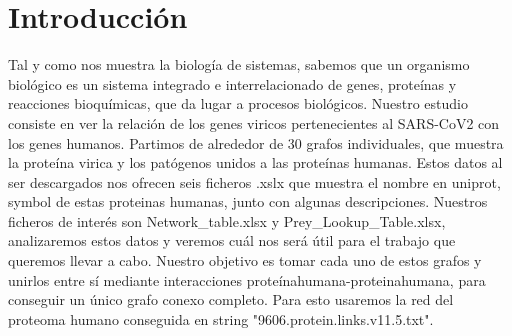 \section{Introducción}

Tal y como nos muestra la biolog\'ia de sistemas, sabemos que un organismo biol\'ogico es un sistema integrado e interrelacionado de genes,
prote\'inas y reacciones bioqu\'imicas, que da lugar a procesos biol\'ogicos. Nuestro estudio consiste en ver la relación de los genes viricos 
pertenecientes al SARS-CoV2 con los genes humanos. Partimos de alrededor de 30 grafos individuales, que muestra la prote\'ina virica y los
pat\'ogenos unidos a las prote\'inas humanas. Estos datos al ser descargados nos ofrecen seis ficheros .xslx que muestra el nombre en uniprot, 
symbol de estas proteinas humanas, junto con algunas descripciones. Nuestros ficheros de inter\'es son Network\_table.xlsx y Prey\_Lookup\_Table.xlsx, 
analizaremos estos datos y veremos cu\'al nos ser\'a \'util para el trabajo que queremos llevar a cabo. Nuestro objetivo es tomar cada uno de estos grafos
y unirlos entre s\'i mediante interacciones proteínahumana-proteinahumana, para conseguir un \'unico grafo conexo completo.
Para esto usaremos la red del proteoma humano conseguida en string "9606.protein.links.v11.5.txt".
